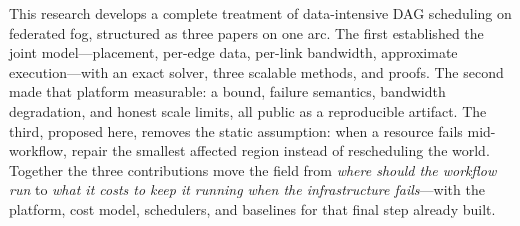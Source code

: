 \documentclass[11pt]{article}
\begin{document}
This research develops a complete treatment of data-intensive
DAG scheduling on federated fog, structured as three papers on
one arc. The first established the joint model---placement,
per-edge data, per-link bandwidth, approximate execution---with
an exact solver, three scalable methods, and proofs. The second
made that platform measurable: a bound, failure semantics,
bandwidth degradation, and honest scale limits, all public as a
reproducible artifact. The third, proposed here, removes the
static assumption: when a resource fails mid-workflow, repair
the smallest affected region instead of rescheduling the world.
Together the three contributions move the field from \emph{where
should the workflow run} to \emph{what it costs to keep it
running when the infrastructure fails}---with the platform, cost
model, schedulers, and baselines for that final step already
built.
\end{document}
